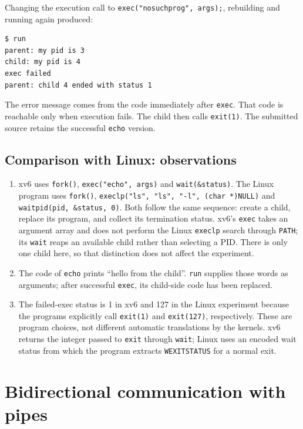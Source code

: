 \documentclass{../latex/utmreport}
\providecommand{\tightlist}{\setlength{\itemsep}{0pt}\setlength{\parskip}{0pt}}
\begin{document}
Changing the execution call to \texttt{exec("nosuchprog",\ args);},
rebuilding and running again produced:

\begin{lstlisting}
$ run
parent: my pid is 3
child: my pid is 4
exec failed
parent: child 4 ended with status 1
\end{lstlisting}

The error message comes from the code immediately after \texttt{exec}.
That code is reachable only when execution fails. The child then calls
\texttt{exit(1)}. The submitted source retains the successful
\texttt{echo} version.

\section{Comparison with Linux:
observations}\label{comparison-with-linux-observations}

\begin{enumerate}
\def\labelenumi{\arabic{enumi}.}
\tightlist
\item
  xv6 uses \texttt{fork()}, \texttt{exec("echo",\ args)} and
  \texttt{wait(\&status)}. The Linux program uses \texttt{fork()},
  \texttt{execlp("ls",\ "ls",\ "-l",\ (char\ *)NULL)} and
  \texttt{waitpid(pid,\ \&status,\ 0)}. Both follow the same sequence:
  create a child, replace its program, and collect its termination
  status. xv6's \texttt{exec} takes an argument array and does not
  perform the Linux \texttt{execlp} search through \texttt{PATH}; its
  \texttt{wait} reaps an available child rather than selecting a PID.
  There is only one child here, so that distinction does not affect the
  experiment.
\item
  The code of \texttt{echo} prints ``hello from the child''.
  \texttt{run} supplies those words as arguments; after successful
  \texttt{exec}, its child-side code has been replaced.
\item
  The failed-exec status is 1 in xv6 and 127 in the Linux experiment
  because the programs explicitly call \texttt{exit(1)} and
  \texttt{exit(127)}, respectively. These are program choices, not
  different automatic translations by the kernels. xv6 returns the
  integer passed to \texttt{exit} through \texttt{wait}; Linux uses an
  encoded wait status from which the program extracts
  \texttt{WEXITSTATUS} for a normal exit.
\end{enumerate}

\chapter{Bidirectional communication with
pipes}\label{bidirectional-communication-with-pipes}
\end{document}
